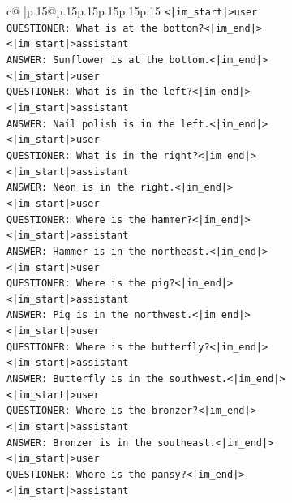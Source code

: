 \documentclass{article}
\begin{document}
{\begin{supertabular}{c@{$\;$}|p{.15\linewidth}@{}p{.15\linewidth}p{.15\linewidth}p{.15\linewidth}p{.15\linewidth}p{.15\linewidth}}
{{{\texttt{<|im\_start|>user} \\
\texttt{QUESTIONER: What is at the bottom?<|im\_end|>} \\
\texttt{<|im\_start|>assistant} \\
\texttt{ANSWER: Sunflower is at the bottom.<|im\_end|>} \\
\texttt{<|im\_start|>user} \\
\texttt{QUESTIONER: What is in the left?<|im\_end|>} \\
\texttt{<|im\_start|>assistant} \\
\texttt{ANSWER: Nail polish is in the left.<|im\_end|>} \\
\texttt{<|im\_start|>user} \\
\texttt{QUESTIONER: What is in the right?<|im\_end|>} \\
\texttt{<|im\_start|>assistant} \\
\texttt{ANSWER: Neon is in the right.<|im\_end|>} \\
\texttt{<|im\_start|>user} \\
\texttt{QUESTIONER: Where is the hammer?<|im\_end|>} \\
\texttt{<|im\_start|>assistant} \\
\texttt{ANSWER: Hammer is in the northeast.<|im\_end|>} \\
\texttt{<|im\_start|>user} \\
\texttt{QUESTIONER: Where is the pig?<|im\_end|>} \\
\texttt{<|im\_start|>assistant} \\
\texttt{ANSWER: Pig is in the northwest.<|im\_end|>} \\
\texttt{<|im\_start|>user} \\
\texttt{QUESTIONER: Where is the butterfly?<|im\_end|>} \\
\texttt{<|im\_start|>assistant} \\
\texttt{ANSWER: Butterfly is in the southwest.<|im\_end|>} \\
\texttt{<|im\_start|>user} \\
\texttt{QUESTIONER: Where is the bronzer?<|im\_end|>} \\
\texttt{<|im\_start|>assistant} \\
\texttt{ANSWER: Bronzer is in the southeast.<|im\_end|>} \\
\texttt{<|im\_start|>user} \\
\texttt{QUESTIONER: Where is the pansy?<|im\_end|>} \\
\texttt{<|im\_start|>assistant} \\
}}}
\end{supertabular}}
\end{document}
